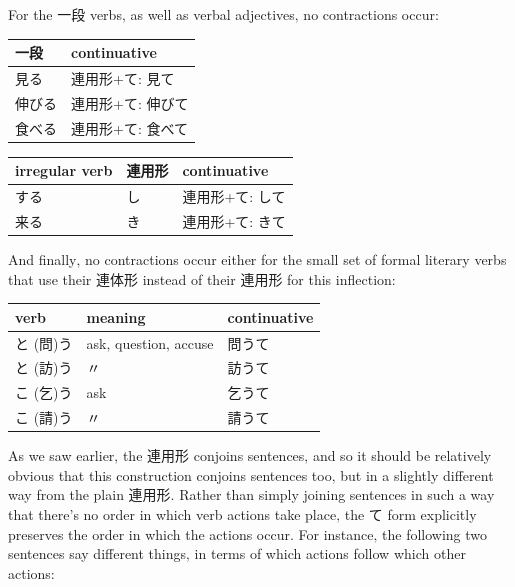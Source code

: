 \documentclass[11pt, b5paper, twoside, openright, onecolumn]{book}
\makeatletter
\newcommand*{\rtrubystack}[2]{{\relscale{0.5}%
  \begin{tabular}[b]{@{}c@{}}%
    {#1}\\%
    {\textscale{2}{#2}}%
  \end{tabular}}%
}
\DeclareRobustCommand*{\rtruby}[2]{%
  \mbox{%
    \setlength{\parskip}{0ex}%
    \BeginAccSupp{method=pdfstringdef,ActualText={#1}}%
      \rtrubystack{\phantom{#2}}{#1}%
      \llap{%
        \rtrubystack{#2}{\phantom{#1}}%
      }%
    \EndAccSupp{}%
  }%
}
\renewcommand*{\rtruby}[2]{#2 (#1)}%
\newenvironment{mytabular}[1]{\noindent\hspace{0.4in}
\begin{tabular}[h]{#1}}{\end{tabular}}
\makeatother
\begin{document}
For the 一段 verbs‚ as well as verbal adjectives‚ no contractions occur:

\vspace{0.5cm}
\smaller
\begin{mytabular}{| l  l |}\hline 
\rule{0pt}{2.4ex}一段 & continuative\\ 
\hline
\rule{0pt}{2.4ex}見る & 連用形+て: 見て\\ 
\rule{0pt}{2.4ex}伸びる & 連用形+て: 伸びて\\ 
\rule{0pt}{2.4ex}食べる & 連用形+て: 食べて\\ 
\hline 
\end{mytabular}
\larger
\vspace{0.5cm}

\smaller
\begin{mytabular}{| l  l  l |}\hline 
\rule{0pt}{2.4ex}irregular verb & 連用形 & continuative\\ 
\hline
\rule{0pt}{2.4ex}する & し & 連用形+て: して\\ 
\rule{0pt}{2.4ex}来る & き & 連用形+て: きて\\ 
\hline 
\end{mytabular}
\larger
\vspace{0.5cm}


And finally‚ no contractions occur either for the small set of formal literary verbs that use their 連体形 instead of their 連用形 for this inflection:

\vspace{0.5cm}
\smaller
\begin{mytabular}{| l  l  l |}\hline 
\rule{0pt}{2.4ex}verb & meaning & continuative\\ 
\hline
\rule{0pt}{3.6ex}\rtruby{問}{と}う & ask‚ question‚ accuse & 問うて\\ 
\rule{0pt}{3.6ex}\rtruby{訪}{と}う & 〃 & 訪うて\\ 
\rule{0pt}{3.6ex}\rtruby{乞}{こ}う & ask & 乞うて\\ 
\rule{0pt}{3.6ex}\rtruby{請}{こ}う & 〃 & 請うて\\ 
\hline 
\end{mytabular}
\larger
\vspace{0.5cm}



As we saw earlier‚ the 連用形 conjoins sentences‚ and so it should be relatively obvious that this construction conjoins sentences too‚ but in a slightly different way from the plain 連用形. Rather than simply joining sentences in such a way that there’s no order in which verb actions take place‚ the て form explicitly preserves the order in which the actions occur. For instance‚ the following two sentences say different things‚ in terms of which actions follow which other actions:
\end{document}
